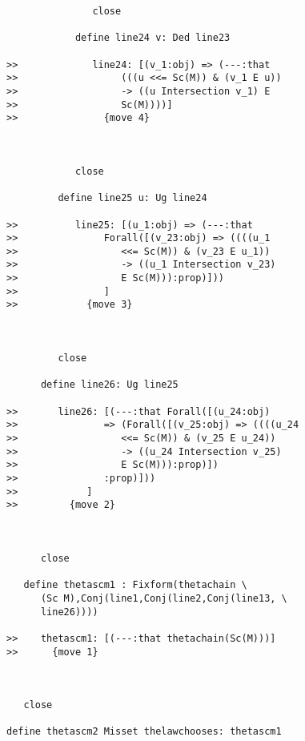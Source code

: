 \documentclass[12pt]{article}
\begin{document}
\begin{verbatim}
               close

            define line24 v: Ded line23

>>             line24: [(v_1:obj) => (---:that
>>                  (((u <<= Sc(M)) & (v_1 E u))
>>                  -> ((u Intersection v_1) E
>>                  Sc(M))))]
>>               {move 4}



            close

         define line25 u: Ug line24

>>          line25: [(u_1:obj) => (---:that
>>               Forall([(v_23:obj) => ((((u_1
>>                  <<= Sc(M)) & (v_23 E u_1))
>>                  -> ((u_1 Intersection v_23)
>>                  E Sc(M))):prop)]))
>>               ]
>>            {move 3}



         close

      define line26: Ug line25

>>       line26: [(---:that Forall([(u_24:obj)
>>               => (Forall([(v_25:obj) => ((((u_24
>>                  <<= Sc(M)) & (v_25 E u_24))
>>                  -> ((u_24 Intersection v_25)
>>                  E Sc(M))):prop)])
>>               :prop)]))
>>            ]
>>         {move 2}



      close

   define thetascm1 : Fixform(thetachain \
      (Sc M),Conj(line1,Conj(line2,Conj(line13, \
      line26))))

>>    thetascm1: [(---:that thetachain(Sc(M)))]
>>      {move 1}



   close

define thetascm2 Misset thelawchooses: thetascm1



\end{verbatim}
\end{document}
